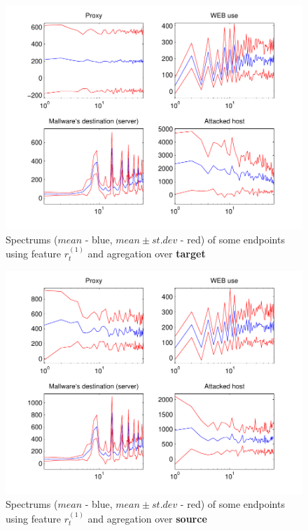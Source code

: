 \documentclass[a4paper]{IEEEtran}
\begin{document}
\begin{figure}[h!]%
  \centering
  \includegraphics[width=140mm]{spect_dst_bdivp}
  \caption{Spectrums ($mean$ - blue, $mean\pm st.dev$ - red) of some  endpoints using feature $r_t^{(1)}$ and agregation over \textbf{target}}
  \label{fig:spect_dst_bdivp}
\end{figure}
\begin{figure}[h!]%
  \centering
  \includegraphics[width=140mm]{spect_src_bdivp}
  \caption{Spectrums ($mean$ - blue, $mean\pm st.dev$ - red) of some  endpoints using feature $r_t^{(1)}$ and agregation over \textbf{source}}
  \label{fig:spect_src_bdivp}
\end{figure}
\end{document}
